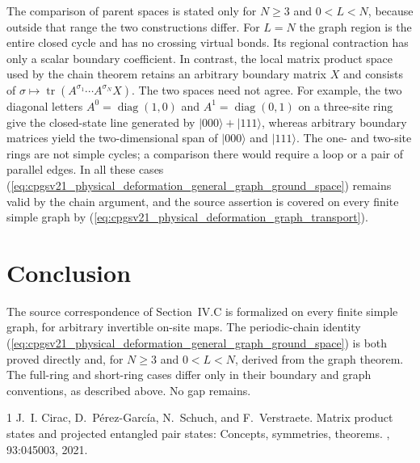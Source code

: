 \documentclass{article}
\begin{document}
The comparison of parent spaces is stated only for $N\ge3$ and $0<L<N$,
because outside that range the two constructions differ. For $L=N$ the graph
region is the entire closed cycle and has no crossing virtual bonds. Its
regional contraction has only a scalar boundary coefficient. In contrast, the
local matrix product space used by the chain theorem retains an arbitrary
boundary matrix $X$ and consists of
$\sigma\mapsto\operatorname{tr}(A^{\sigma_1}\cdots A^{\sigma_N}X)$. The two
spaces need not agree. For example, the two diagonal letters
$A^0=\operatorname{diag}(1,0)$ and $A^1=\operatorname{diag}(0,1)$ on a
three-site ring give the closed-state line generated by
$|000\rangle+|111\rangle$, whereas arbitrary boundary matrices yield the
two-dimensional span of $|000\rangle$ and $|111\rangle$. The one- and
two-site rings are not simple cycles; a comparison there would require a
loop or a pair of parallel edges. In all these cases
(\ref{eq:cpgsv21_physical_deformation_general_graph_ground_space}) remains
valid by the chain argument, and the source assertion is covered on every
finite simple graph by
(\ref{eq:cpgsv21_physical_deformation_graph_transport}).

\section{Conclusion}

The source correspondence of Section~IV.C is formalized on every finite simple
graph, for arbitrary invertible on-site maps. The periodic-chain identity
(\ref{eq:cpgsv21_physical_deformation_general_graph_ground_space}) is both
proved directly and, for $N\ge3$ and $0<L<N$, derived from the graph theorem.
The full-ring and short-ring cases differ only in their boundary and graph
conventions, as described above. No gap remains.

\begin{thebibliography}{1}
    J.~I. Cirac, D.~P\'erez-Garc\'ia, N.~Schuch, and F.~Verstraete.
    \newblock Matrix product states and projected entangled pair states: Concepts, symmetries, theorems.
    , 93:045003, 2021.
\end{thebibliography}
\end{document}
